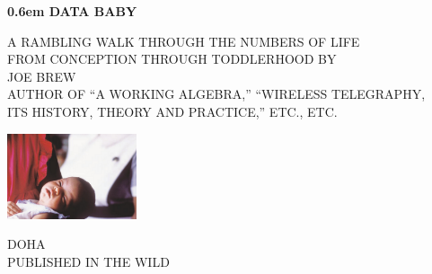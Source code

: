 \documentclass{book}
\begin{document}
\clearpage
\newcommand\nbvspace[1][3]{\vspace*{\stretch{#1}}}
\newcommand\nbstretchyspace{\spaceskip0.5em plus 0.25em minus 0.25em}
\newcommand{\nbtitlestretch}{\spaceskip0.6em}
\pagestyle{empty}
\begin{center}
\bfseries
\nbvspace[1]
\Huge
{\nbtitlestretch\huge
DATA BABY}

\nbvspace[1]
\normalsize

A RAMBLING WALK THROUGH THE NUMBERS OF LIFE\\
FROM CONCEPTION THROUGH TODDLERHOOD
\nbvspace[1]
\small BY\\
\Large JOE BREW\\[0.5em]
\footnotesize AUTHOR OF ``A WORKING ALGEBRA,'' ``WIRELESS TELEGRAPHY,\\
ITS HISTORY, THEORY AND PRACTICE,'' ETC., ETC.

\nbvspace[2]

\includegraphics[width=1.5in]{./graphics/pic37}
\nbvspace[3]
\normalsize

DOHA\\
\large
PUBLISHED IN THE WILD
\nbvspace[1]
\end{center}
\end{document}
